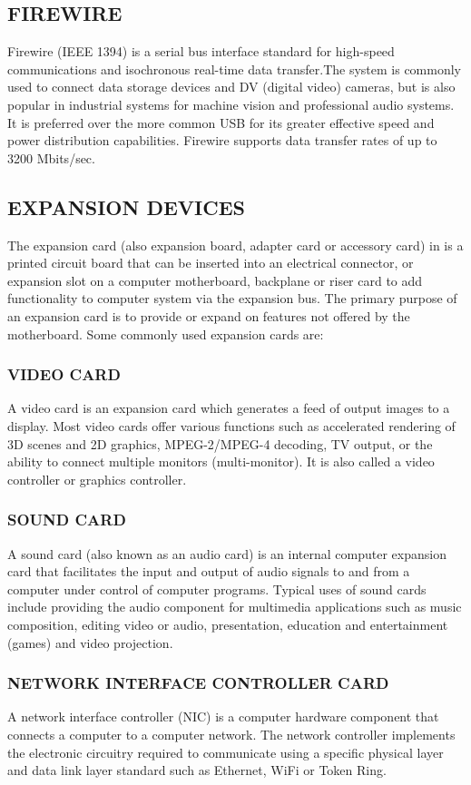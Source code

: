 		\subsection*{ FIREWIRE}
	 Firewire (IEEE 1394) is a serial bus interface standard for high-speed communications
	and isochronous real-time data transfer.The system is commonly used to connect data storage
	devices and DV (digital video) cameras, but is also popular in industrial systems for machine vision and
	professional audio systems. It is preferred over the more common USB for its greater effective speed and
	power distribution capabilities. Firewire supports data transfer rates of up to 3200 Mbits/sec.
		\subsection*{EXPANSION DEVICES}
	The expansion card (also expansion board, adapter card or accessory card) in is a printed circuit board that can
	be inserted into an electrical connector, or expansion slot on a computer motherboard, backplane or riser card to
	add functionality to computer system via the expansion bus. The primary purpose of an expansion card is to
	provide or expand on features not offered by the motherboard. Some commonly used expansion cards are:
		\subsubsection*{VIDEO CARD} 
	A video card is an expansion card which generates a feed of output images to a display.
	Most video cards offer various functions such as accelerated rendering of 3D scenes and 2D graphics,
	MPEG-2/MPEG-4 decoding, TV output, or the ability to connect multiple monitors (multi-monitor). It is
	also called a video controller or graphics controller.
	\subsubsection*{SOUND CARD}
	 A sound card (also known as an audio card) is an internal computer expansion card that
	facilitates the input and output of audio signals to and from a computer under control of computer
	programs. Typical uses of sound cards include providing the audio component for multimedia applications
	such as music composition, editing video or audio, presentation, education and entertainment (games) and
	video projection.
	\subsubsection*{ NETWORK INTERFACE CONTROLLER CARD}
	 A network interface controller (NIC) is a computer hardware component
	that connects a computer to a computer network. The network controller implements the electronic circuitry
	required to communicate using a specific physical layer and data link layer standard such as Ethernet, WiFi
	or Token Ring.
